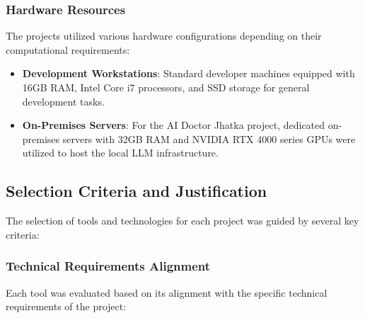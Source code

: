 \documentclass[12pt,a4paper]{article}
\begin{document}
\subsubsection{Hardware Resources}
The projects utilized various hardware configurations depending on their computational requirements:

\begin{itemize}
    \item \textbf{Development Workstations}: Standard developer machines equipped with 16GB RAM, Intel Core i7 processors, and SSD storage for general development tasks.
    
    \item \textbf{On-Premises Servers}: For the AI Doctor Jhatka project, dedicated on-premises servers with 32GB RAM and NVIDIA RTX 4000 series GPUs were utilized to host the local LLM infrastructure.
\end{itemize}

\subsection{Selection Criteria and Justification}

The selection of tools and technologies for each project was guided by several key criteria:

\subsubsection{Technical Requirements Alignment}
Each tool was evaluated based on its alignment with the specific technical requirements of the project:
\end{document}
